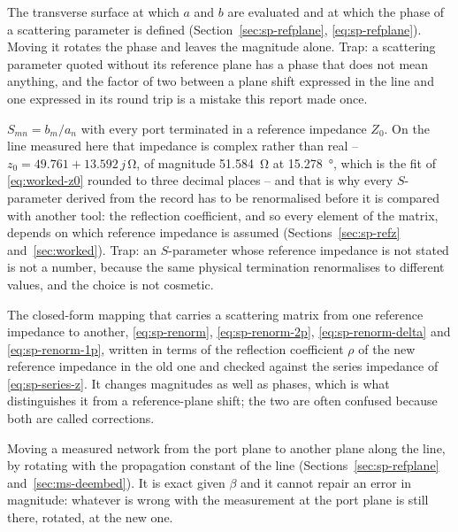 \begin{description}[leftmargin=1.6em,style=nextline,itemsep=4pt]
  \item[Reference plane.]
        The transverse surface at which $a$ and $b$ are evaluated and at which the phase of a scattering
        parameter is defined (Section~\ref{sec:sp-refplane}, \eqref{eq:sp-refplane}). Moving it rotates the phase
        and leaves the magnitude alone. Trap: a scattering parameter quoted without its reference plane has a
        phase that does not mean anything, and the factor of two between a plane shift expressed in the line and
        one expressed in its round trip is a mistake this report made once.

  \item[Scattering parameters and reference impedance.]
        $S_{mn}=b_m/a_n$ with every port terminated in a reference impedance $Z_0$. On the line measured here that
        impedance is complex rather than real -- $z_0 = 49.761 + 13.592\,j$\,\si{\ohm}, of magnitude
        \SI{51.584}{\ohm} at \SI{15.278}{\degree}, which is the fit of \eqref{eq:worked-z0} rounded to three
        decimal places -- and that is why every $S$-parameter derived from the record has to be renormalised
        before it is compared with another tool: the reflection coefficient, and so every element of the matrix,
        depends on which reference impedance is assumed
        (Sections~\ref{sec:sp-refz} and~\ref{sec:worked}). Trap: an $S$-parameter whose reference impedance is
        not stated is not a number, because the same physical termination renormalises to different values, and
        the choice is not cosmetic.

  \item[Renormalisation.]
        The closed-form mapping that carries a scattering matrix from one reference impedance to another,
        \eqref{eq:sp-renorm}, \eqref{eq:sp-renorm-2p}, \eqref{eq:sp-renorm-delta} and \eqref{eq:sp-renorm-1p},
        written in terms of the reflection coefficient $\rho$ of the new reference impedance in the old one and
        checked against the series impedance of \eqref{eq:sp-series-z}. It changes magnitudes as well as phases,
        which is what distinguishes it from a reference-plane shift; the two are often confused because both are
        called corrections.

  \item[De-embedding; reference-plane shift.]
        Moving a measured network from the port plane to another plane along the line, by rotating with the
        propagation constant of the line (Sections~\ref{sec:sp-refplane} and~\ref{sec:ms-deembed}). It is exact
        given $\beta$ and it cannot repair an error in magnitude: whatever is wrong with the measurement at the
        port plane is still there, rotated, at the new one.


\end{description}
